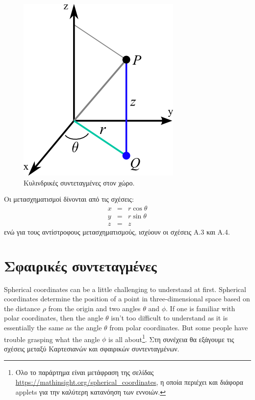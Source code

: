 \begin{figure}[h]
    \centering
    \includegraphics[scale=0.5]{Figures/appendixA_cylindrical_coordinates.png}
    \caption{Κυλινδρικές συντεταγμένες στον χώρο.}
    \label{fig:apxA_cylindrical_coordinates}
\end{figure}

Οι μετασχηματισμοί δίνονται από τις σχέσεις:
\begin{eqnarray}
    x &=& r \cos \theta \\
    y &=& r \sin \theta \\
    z &=& z
\end{eqnarray}
ενώ για τους αντίστροφους μετασχηματισμούς, ισχύουν οι σχέσεις Α.3 και Α.4.

\section{Σφαιρικές συντεταγμένες}
Spherical coordinates can be a little challenging to understand at first. Spherical coordinates determine the position of a point in three-dimensional space based on the distance $\rho$ from the origin and two angles $\theta$ and $\phi$. If one is familiar with polar coordinates, then the angle $\theta$ isn't too difficult to understand as it is essentially the same as the angle $\theta$ from polar coordinates. But some people have trouble grasping what the angle $\phi$ is all about\footnote{Όλο το παράρτημα είναι μετάφραση της σελίδας \url{https://mathinsight.org/spherical_coordinates}, η οποία περιέχει και διάφορα applets για την καλύτερη κατανόηση των εννοιών.}. Στη συνέχεια θα εξάγουμε τις σχέσεις μεταξύ Καρτεσιανών και σφαιρικών συντενταγμένων.

